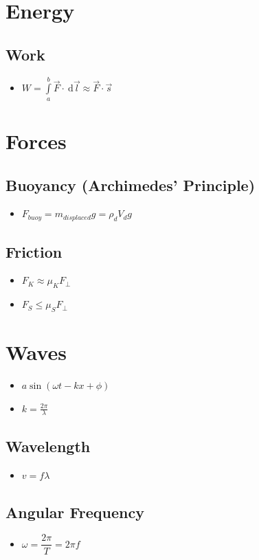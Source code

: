\documentclass[]{report}
\newcommand \tab[1][1cm]{\hspace*{#1}}
\newcommand{\dn}[1]{\ \mathrm{d}#1}
\newcommand{\itemt}{\item \tab}
\begin{document}
	\section{Energy}

\subsection{Work}
\begin{itemize}
\itemt \(W = \int\limits_{a}^{b} \vec{F}\cdot \dn\vec{l} \approx \vec{F} \cdot \vec{s}\)
\end{itemize}
				
	\section{Forces}

\subsection{Buoyancy (Archimedes' Principle)}			
\begin{itemize}
\itemt \( F_{buoy} = m_{displaced}g = \rho_{d} V_{d}g \)
\end{itemize}				

\subsection{Friction}			
\begin{itemize}
\itemt \( F_{K} \approx \mu_K F_\perp \)
\itemt \( F_{S} \leq \mu_S F_\perp \)
\end{itemize}				
				
	\section{Waves}
\begin{itemize}
\itemt \( a \sin(\omega t - kx + \phi) \)
\itemt \( k = \frac{2\pi}{\lambda} \)
\end{itemize}


\subsection{Wavelength}			
\begin{itemize}
\itemt \( v = f\lambda \)
\end{itemize}

\subsection{Angular Frequency}
\begin{itemize}
\itemt \( \omega = \dfrac{2\pi}{T} = 2\pi f \)
\end{itemize}
\end{document}
